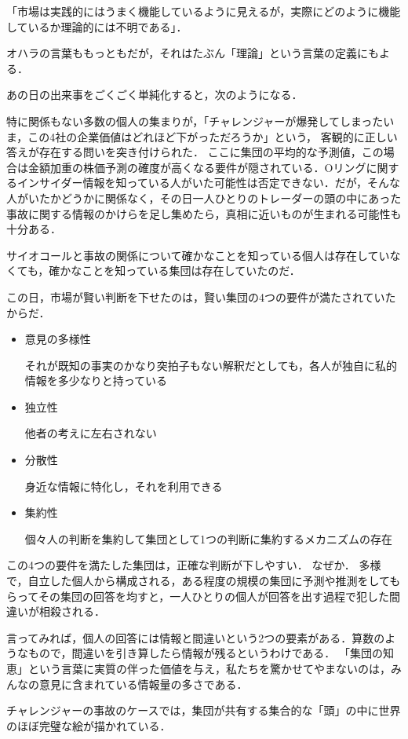 「市場は実践的にはうまく機能しているように見えるが，実際にどのように機能しているか理論的には不明である」．

オハラの言葉ももっともだが，それはたぶん「理論」という言葉の定義にもよる．

あの日の出来事をごくごく単純化すると，次のようになる．

特に関係もない多数の個人の集まりが，「チャレンジャーが爆発してしまったいま，この4社の企業価値はどれほど下がっただろうか」という，
客観的に正しい答えが存在する問いを突き付けられた．
ここに集団の平均的な予測値，この場合は金額加重の株価予測の確度が高くなる要件が隠されている．Oリングに関するインサイダー情報を知っている人がいた可能性は否定できない．だが，そんな人がいたかどうかに関係なく，その日一人ひとりのトレーダーの頭の中にあった事故に関する情報のかけらを足し集めたら，真相に近いものが生まれる可能性も十分ある．

サイオコールと事故の関係について確かなことを知っている個人は存在していなくても，確かなことを知っている集団は存在していたのだ．

この日，市場が賢い判断を下せたのは，賢い集団の4つの要件が満たされていたからだ．
\begin{itemize}
  \item 意見の多様性

それが既知の事実のかなり突拍子もない解釈だとしても，各人が独自に私的情報を多少なりと持っている
  \item 独立性

他者の考えに左右されない
  \item 分散性

身近な情報に特化し，それを利用できる
  \item 集約性  

個々人の判断を集約して集団として1つの判断に集約するメカニズムの存在
\end{itemize}


この4つの要件を満たした集団は，正確な判断が下しやすい．
なぜか．
多様で，自立した個人から構成される，ある程度の規模の集団に予測や推測をしてもらってその集団の回答を均すと，一人ひとりの個人が回答を出す過程で犯した間違いが相殺される．

言ってみれば，個人の回答には情報と間違いという2つの要素がある．算数のようなもので，間違いを引き算したら情報が残るというわけである．
「集団の知恵」という言葉に実質の伴った価値を与え，私たちを驚かせてやまないのは，みんなの意見に含まれている情報量の多さである．

チャレンジャーの事故のケースでは，集団が共有する集合的な「頭」の中に世界のほぼ完璧な絵が描かれている\cite{miyake2}．



